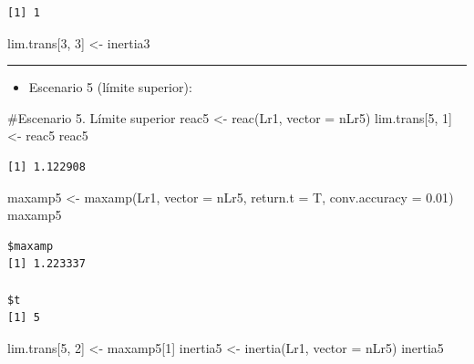 \documentclass[
  12pt,
  letterpaper,
]{book}
\newenvironment{Shaded}{\begin{snugshade}}{\end{snugshade}}
\newcommand{\AttributeTok}[1]{\textcolor[rgb]{0.40,0.45,0.13}{#1}}
\newcommand{\CommentTok}[1]{\textcolor[rgb]{0.37,0.37,0.37}{#1}}
\newcommand{\DecValTok}[1]{\textcolor[rgb]{0.68,0.00,0.00}{#1}}
\newcommand{\FloatTok}[1]{\textcolor[rgb]{0.68,0.00,0.00}{#1}}
\newcommand{\FunctionTok}[1]{\textcolor[rgb]{0.28,0.35,0.67}{#1}}
\newcommand{\NormalTok}[1]{\textcolor[rgb]{0.00,0.23,0.31}{#1}}
\newcommand{\OtherTok}[1]{\textcolor[rgb]{0.00,0.23,0.31}{#1}}
\providecommand{\tightlist}{%
  \setlength{\itemsep}{0pt}\setlength{\parskip}{0pt}}\usepackage{longtable,booktabs,array}
\begin{document}
\begin{verbatim}
[1] 1
\end{verbatim}

\begin{Shaded}
\begin{Highlighting}[]
\NormalTok{lim.trans[}\DecValTok{3}\NormalTok{, }\DecValTok{3}\NormalTok{] }\OtherTok{\textless{}{-}}\NormalTok{ inertia3}
\end{Highlighting}
\end{Shaded}

\begin{center}\rule{0.5\linewidth}{0.5pt}\end{center}

\begin{itemize}
\tightlist
\item
  Escenario 5 (límite superior):
\end{itemize}

\begin{Shaded}
\begin{Highlighting}[]
\CommentTok{\#Escenario 5. Límite superior}
\NormalTok{reac5 }\OtherTok{\textless{}{-}} \FunctionTok{reac}\NormalTok{(Lr1, }\AttributeTok{vector =}\NormalTok{ nLr5)}
\NormalTok{lim.trans[}\DecValTok{5}\NormalTok{, }\DecValTok{1}\NormalTok{] }\OtherTok{\textless{}{-}}\NormalTok{ reac5}
\NormalTok{reac5}
\end{Highlighting}
\end{Shaded}

\begin{verbatim}
[1] 1.122908
\end{verbatim}

\begin{Shaded}
\begin{Highlighting}[]
\NormalTok{maxamp5 }\OtherTok{\textless{}{-}} \FunctionTok{maxamp}\NormalTok{(Lr1, }\AttributeTok{vector =}\NormalTok{ nLr5, }\AttributeTok{return.t =}\NormalTok{ T, }\AttributeTok{conv.accuracy =} \FloatTok{0.01}\NormalTok{)}
\NormalTok{maxamp5}
\end{Highlighting}
\end{Shaded}

\begin{verbatim}
$maxamp
[1] 1.223337

$t
[1] 5
\end{verbatim}

\begin{Shaded}
\begin{Highlighting}[]
\NormalTok{lim.trans[}\DecValTok{5}\NormalTok{, }\DecValTok{2}\NormalTok{] }\OtherTok{\textless{}{-}}\NormalTok{ maxamp5[}\DecValTok{1}\NormalTok{]}
\NormalTok{inertia5 }\OtherTok{\textless{}{-}} \FunctionTok{inertia}\NormalTok{(Lr1, }\AttributeTok{vector =}\NormalTok{ nLr5)}
\NormalTok{inertia5}
\end{Highlighting}
\end{Shaded}
\end{document}
